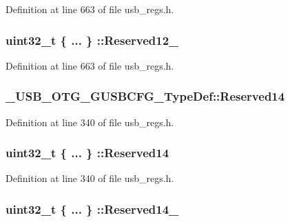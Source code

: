Definition at line 663 of file usb\-\_\-regs.\-h.

\hypertarget{group___u_s_b___o_t_g___d_r_i_v_e_r_ga0f73eb1f12861a5430eb5a681215197c}{
\subsubsection[{Reserved12\-\_\-31}]{\setlength{\rightskip}{0pt plus 5cm}uint32\-\_\-t \{ ... \} \-::Reserved12\-\_}}\label{group___u_s_b___o_t_g___d_r_i_v_e_r_ga0f73eb1f12861a5430eb5a681215197c}


Definition at line 663 of file usb\-\_\-regs.\-h.

\hypertarget{group___u_s_b___o_t_g___d_r_i_v_e_r_gad90fd2d32cf23ca2f2b1edb8139de1a0}{
\subsubsection[{Reserved14}]{ \-\_\-\-U\-S\-B\-\_\-\-O\-T\-G\-\_\-\-G\-U\-S\-B\-C\-F\-G\-\_\-\-Type\-Def\-::\-Reserved14}}\label{group___u_s_b___o_t_g___d_r_i_v_e_r_gad90fd2d32cf23ca2f2b1edb8139de1a0}


Definition at line 340 of file usb\-\_\-regs.\-h.

\hypertarget{group___u_s_b___o_t_g___d_r_i_v_e_r_ga8c6ed6dc6dbb897e4d867707a7b4894d}{
\subsubsection[{Reserved14}]{\setlength{\rightskip}{0pt plus 5cm}uint32\-\_\-t \{ ... \} \-::Reserved14}}\label{group___u_s_b___o_t_g___d_r_i_v_e_r_ga8c6ed6dc6dbb897e4d867707a7b4894d}


Definition at line 340 of file usb\-\_\-regs.\-h.

\hypertarget{group___u_s_b___o_t_g___d_r_i_v_e_r_ga4b62e51c26b822b2f7756af64d2b6cf9}{
\subsubsection[{Reserved14\-\_\-31}]{\setlength{\rightskip}{0pt plus 5cm}uint32\-\_\-t \{ ... \} \-::Reserved14\-\_}}\label{group___u_s_b___o_t_g___d_r_i_v_e_r_ga4b62e51c26b822b2f7756af64d2b6cf9}


